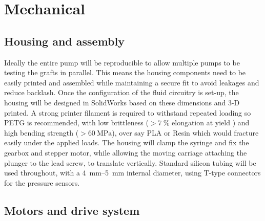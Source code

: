 \documentclass[10pt, a4paper]{article}
\begin{document}
\section{Mechanical}

\subsection{Housing and assembly}

Ideally the entire pump will be reproducible to allow multiple pumps to be testing the grafts in parallel. This means the housing components need to be easily printed and assembled while maintaining a secure fit to avoid leakages and reduce backlash. Once the configuration of the fluid circuitry is set-up, the housing will be designed in SolidWorks based on these dimensions and 3-D printed. A strong printer filament is required to withstand repeated loading so PETG is recommended, with low brittleness ($>\qty{7}{\percent}$ elongation at yield \cite{PETGHFa}) and high bending strength ($>\qty{60}{\mega\pascal}$), over say PLA or Resin which would fracture easily under the applied loads. The housing will clamp the syringe and fix the gearbox and stepper motor, while allowing the moving carriage attaching the plunger to the lead screw, to translate vertically. Standard silicon tubing will be used throughout, with a \qtyrange{4}{5}{\milli\metre} internal diameter, using T-type connectors for the pressure sensors.

\subsection{Motors and drive system}
\end{document}
